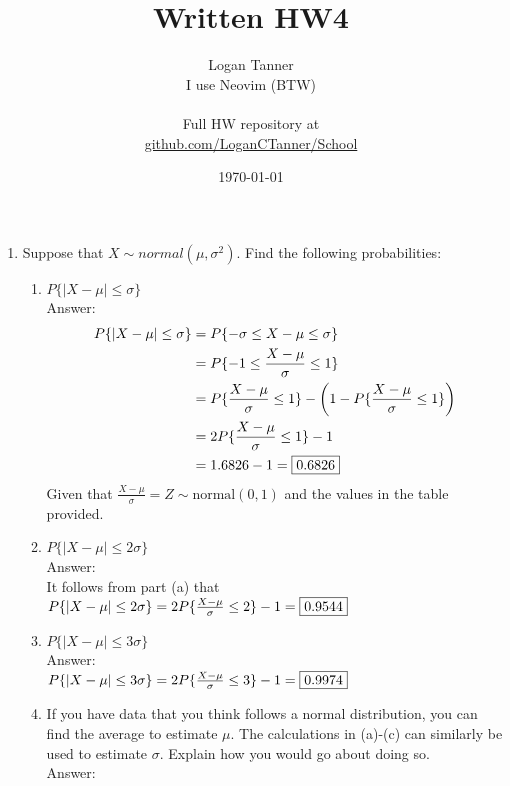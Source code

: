 \documentclass{article}
\title{Written HW4}
\author{
    Logan Tanner \\ 
    I use Neovim (BTW) \\ 
    \\
    Full HW repository at \\
    \href{https://github.com/LoganCTanner/School/tree/main/Math/425-Probability}{github.com/LoganCTanner/School}
}
\date{\today}
\begin{document}
\maketitle

\clearpage
\begin{enumerate}

    \item   Suppose that $ X \sim normal(\mu,\sigma^2) $. Find the following probabilities:
        \begin{enumerate}

            \item   $P\{|X - \mu | \leq \sigma\}$
                \\Answer:
                \begin{align*}
                    P\{|X - \mu | \leq \sigma\} &= P\{-\sigma \leq X - \mu \leq \sigma\} \\
                    &= P\{-1 \leq \frac{X - \mu}{\sigma} \leq 1\} \\
                    &= P\{\frac{X - \mu}{\sigma} \leq 1\} - \left( 1 - P\{\frac{X - \mu}{\sigma} \leq 1\}\right) \\
                    &= 2P\{\frac{X - \mu}{\sigma} \leq 1\} - 1 \\
                    &= 1.6826 - 1 = \fbox{0.6826}
                \end{align*}
                Given that $\frac{X-\mu}{\sigma} = Z \sim \text{normal}(0,1)$ and the values in the table provided.
            \item   $P\{|X - \mu | \leq 2\sigma\}$ \\
                Answer:\\
                It follows from part (a) that \\
                $ P\{|X - \mu | \leq 2\sigma\} = 2P\{\frac{X - \mu}{\sigma} \leq 2\} - 1 = \fbox{0.9544} $
            \item   $P\{|X - \mu | \leq 3\sigma\}$\\
                Answer:\\
                $ P\{|X - \mu | \leq 3\sigma\} = 2P\{\frac{X - \mu}{\sigma} \leq 3\} - 1 = \fbox{0.9974} $
            \item   If you have data that you think follows a normal distribution, you can find the average to estimate $\mu$.
                    The calculations in (a)-(c) can similarly be used to estimate $\sigma$. Explain how you would go
                    about doing so.
                    \\Answer:\\

\end{enumerate}
\end{enumerate}
\end{document}
